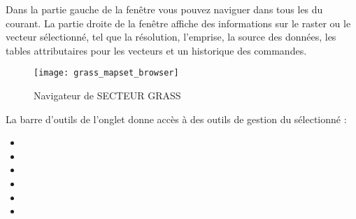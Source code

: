 Dans la partie gauche de la fen\^etre vous pouvez naviguer dans tous les  du  courant. La partie droite de la fen\^etre affiche des informations sur le raster ou le vecteur s\'electionn\'e, tel que la r\'esolution, l'emprise, la source des donn\'ees, les tables attributaires pour les vecteurs et un historique des commandes.


\begin{figure}[h]
 \begin{center}
 \caption{Navigateur de SECTEUR GRASS \nixcaption}\label{fig:grass_mapset_browser}
 \texttt{[image: grass\_mapset\_browser]}
 \end{center}
\end{figure}

La barre d'outils de l'onglet  donne acc\`es \`a des outils de gestion du  s\'electionn\'e :

\begin{itemize}
\item {}
\item {}
\item {}
\item {}
\item {}
\item {}

\end{itemize}

